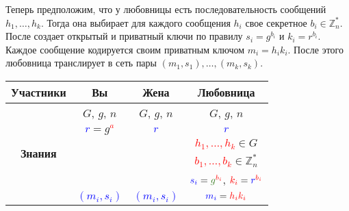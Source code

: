 Теперь предположим, что у любовницы есть последовательность сообщений $h_1,\ldots, h_k$.
Тогда она выбирает для каждого сообщения $h_i$ свое секретное $b_i\in\mathbb Z_n^*$.
После создает открытый и приватный ключи по правилу $s_i = g^{b_i}$ и $k_i = r^{b_i}$.
Каждое сообщение кодируется своим приватным ключом $m_i = h_i k_i$.
После этого любовница транслирует в сеть пары $(m_1, s_1),\ldots,(m_k, s_k)$.
\begin{center}
\begin{tabular}{|c|c|c|c|}
\hline
{\bf Участники}&{Вы}&{Жена}&{Любовница}\\
\hline
\multirow{6}{*}{\bf Знания}&{\textcolor{OliveGreen}{$G$}, \textcolor{OliveGreen}{$g$}, \textcolor{OliveGreen}{$n$}}&{\textcolor{OliveGreen}{$G$}, \textcolor{OliveGreen}{$g$}, \textcolor{OliveGreen}{$n$}}&{\textcolor{OliveGreen}{$G$}, \textcolor{OliveGreen}{$g$}, \textcolor{OliveGreen}{$n$}}\\
{}&{ \textcolor{blue}{$r$}$=$\textcolor{OliveGreen}{$ g$}\textcolor{red}{${}^a$}}&{\textcolor{blue}{$r$}}&{\textcolor{blue}{$r$}}\\
{}&{}&{}&{\textcolor{red}{$h_1,\ldots,h_k$}$\in G$}\\
{}&{}&{}&{\textcolor{red}{$b_1,\ldots,b_k$}$\in \mathbb Z_n^*$}\\
{}&{}&{}&{$\textcolor{blue}{s_i} = \textcolor{OliveGreen}{g}^{\textcolor{red}{b_i}}$, $\textcolor{red}{k_i} = \textcolor{blue}{r}^{\textcolor{red}{b_i}}$}\\
{}&{\textcolor{blue}{$(m_i, s_i)$}}&{\textcolor{blue}{$(m_i, s_i)$}}&{$\textcolor{blue}{m_i} = \textcolor{red}{h_i k_i}$}\\
\hline
\end{tabular}
\end{center}

